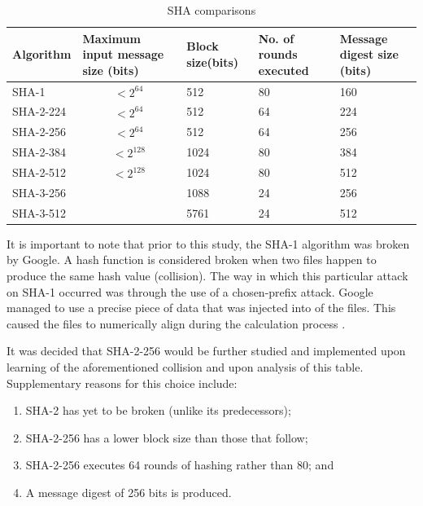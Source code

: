     
    \begin{table}[h]
    \caption{SHA comparisons}
    \centering
     \begin{tabular}{|p{} | p{}| p{}| p{}| p{}|} 
     \hline
    	\textbf{Algorithm} & \textbf{Maximum input message size (bits)} & \textbf{Block size(bits)} & \textbf{No. of rounds executed} & \textbf{Message digest size (bits)} \\ [1ex] 
     \hline\hline
     SHA-1 & \[ <2^{64}\] & 512 & 80 & 160 \\[1ex]
     \hline
     SHA-2-224 & \[ <2^{64}\] & 512 & 64 & 224 \\[1ex]
     \hline
     SHA-2-256 & \[ <2^{64}\] & 512 & 64 & 256 \\[1ex]
     \hline           
     SHA-2-384 & \[ <2^{128}\] & 1024 & 80 & 384 \\[1ex]
     \hline      
     SHA-2-512 & \[ <2^{128}\] & 1024 & 80 & 512 \\[1ex]
     \hline
     SHA-3-256 & \centering{Unlimited} & 1088 & 24 & 256 \\[1ex] 
     \hline
     SHA-3-512 & \centering{Unlimited} & 5761 & 24 & 512 \\[1ex]
     \hline
     \end{tabular}
     \label{table: SHA comparisons}
    \end{table}
    It is important to note that prior to this study, the SHA-1 algorithm was broken by Google. A hash function is considered broken when two files happen to produce the same hash value (collision). The way in which this particular attack on SHA-1 occurred was through the use of a chosen-prefix attack. Google managed to use a precise piece of data that was injected into of the files. This caused the files to numerically align during the calculation process \cite{Stevens2017}.
    
    It was decided that SHA-2-256 would be further studied and implemented upon learning of the aforementioned collision and upon analysis of this table. Supplementary reasons for this choice include:
    
        \begin{enumerate}[label=\roman*.]
            
            \item SHA-2 has yet to be broken (unlike its predecessors);
            \item SHA-2-256 has a lower block size than those that follow; \item SHA-2-256 executes 64 rounds of hashing rather than 80; and
            \item A message digest of 256 bits is produced.

        \end{enumerate}
    
